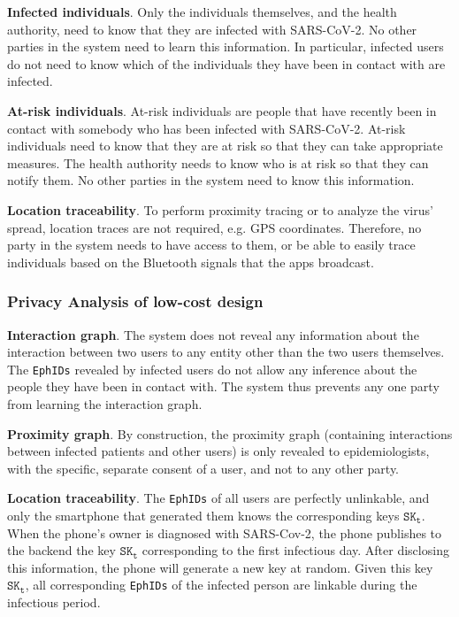 \documentclass[10.8pt,a4paper]{article}
\begin{document}
\textbf{Infected individuals}. Only the individuals themselves, and the health authority, need to know that they are infected with SARS-CoV-2. No other parties in the system need to learn this information. In particular, infected users do not need to know which of the individuals they have been in contact with are infected.

\textbf{At-risk individuals}. At-risk individuals are people that have recently been in contact with somebody who has been infected with SARS-CoV-2. At-risk individuals need to know that they are at risk so that they can take appropriate measures. The health authority needs to know who is at risk so that they can notify them. No other parties in the system need to know this information.

\textbf{Location traceability}. To perform proximity tracing or to analyze the virus’ spread, location traces are not required, e.g. GPS coordinates. Therefore, no party in the system needs to have access to them, or be able to easily trace individuals based on the Bluetooth signals that the apps broadcast.

\subsubsection{Privacy Analysis of low-cost design}

\textbf{Interaction graph}. The system does not reveal any information about the interaction between two users to any entity other than the two users themselves. The \texttt{EphIDs} revealed by infected users do not allow any inference about the people they have been in contact with. The system thus prevents any one party from learning the interaction graph.

\textbf{Proximity graph}. By construction, the proximity graph (containing interactions between infected patients and other users) is only revealed to epidemiologists, with the specific, separate consent of a user, and not to any other party.

\textbf{Location traceability}. The \texttt{EphIDs} of all users are perfectly unlinkable, and only the smartphone that generated them knows the corresponding keys $\texttt{SK}_\texttt{t}$. When the phone’s owner is diagnosed with SARS-Cov-2, the phone publishes to the backend the key $\texttt{SK}_\texttt{t}$ corresponding to the first infectious day. After disclosing this information, the phone will generate a new key at random. Given this key $\texttt{SK}_\texttt{t}$, all corresponding \texttt{EphIDs} of the infected person are linkable during the infectious period.
\end{document}
